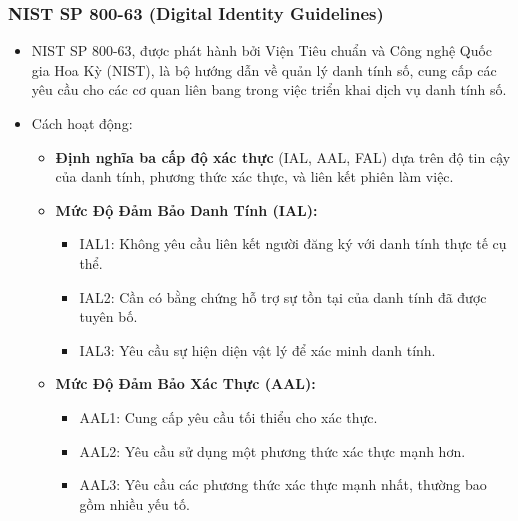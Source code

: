 \subsubsection{NIST SP 800-63 (Digital Identity Guidelines)}
\begin{itemize}
    \item NIST SP 800-63, được phát hành bởi Viện Tiêu chuẩn và Công nghệ Quốc gia Hoa Kỳ (NIST), là bộ hướng dẫn về quản lý danh tính số, cung cấp các yêu cầu cho các cơ quan liên bang trong việc triển khai dịch vụ danh tính số. 

    \item Cách hoạt động:
    \begin{itemize}
        \item \textbf{Định nghĩa ba cấp độ xác thực} (IAL, AAL, FAL) dựa trên độ tin cậy của danh tính, phương thức xác thực, và liên kết phiên làm việc.
        \item \textbf{Mức Độ Đảm Bảo Danh Tính (IAL):}
        \begin{itemize}
            \item IAL1: Không yêu cầu liên kết người đăng ký với danh tính thực tế cụ thể.
            \item IAL2: Cần có bằng chứng hỗ trợ sự tồn tại của danh tính đã được tuyên bố.
            \item IAL3: Yêu cầu sự hiện diện vật lý để xác minh danh tính.
        \end{itemize}
        \item \textbf{Mức Độ Đảm Bảo Xác Thực (AAL):}
        \begin{itemize}
            \item AAL1: Cung cấp yêu cầu tối thiểu cho xác thực.
            \item AAL2: Yêu cầu sử dụng một phương thức xác thực mạnh hơn.
            \item AAL3: Yêu cầu các phương thức xác thực mạnh nhất, thường bao gồm nhiều yếu tố.
        \end{itemize}


\end{itemize}
\end{itemize}
